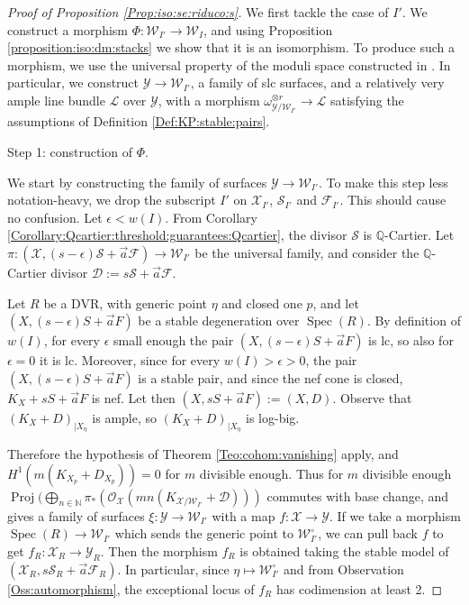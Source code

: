 \documentclass[11pt]{amsart}
\newcommand{\cE}{\mathcal{W}}
\newcommand{\sD}{\mathscr{D}}
\newcommand{\sF}{\mathscr{F}}
\newcommand{\sL}{\mathscr{L}}
\newcommand{\sS}{\mathscr{S}}
\newcommand{\sX}{\mathscr{X}}
\newcommand{\cO}{\mathcal{O}}
\newcommand{\spec}{\operatorname{Spec}}
\newcommand{\sY}{\mathscr{Y}}
\theoremstyle{definition}
\begin{document}
\begin{proof}[Proof of Proposition \ref{Prop:iso:se:riduco:s}] We first tackle the case of $I'$.
We construct a morphism $\Phi:\cE_{I'} \to \cE_I$, and using Proposition \ref{proposition:iso:dm:stacks} we show that it is an isomorphism.
To produce such a morphism, we use the universal property of the moduli space constructed in \cite{KP}. In particular, we
construct $\sY \to \cE_{I'}$, a family of slc surfaces, and a relatively very ample line bundle $\sL$ over $\sY$, with a morphism
$\omega_{\sY/\cE_{I'}}^{\otimes r} \to \sL$ satisfying the assumptions of Definition \ref{Def:KP:stable:pairs}.

\begin{bf}Step 1: construction of $\Phi$.\end{bf}
 We start by constructing the family of surfaces $\sY \to \cE_{I'}$. To make this step less notation-heavy, we drop the subscript $I'$ on $\sX_{I'}$, $\sS_{I'}$ and $\sF_{I'}$. This should cause no confusion. Let $\epsilon<w(I)$. From Corollary \ref{Corollary:Qcartier:threshold:guarantees:Qcartier}, the divisor
 $\sS$ is $\mathbb{Q}$-Cartier.
 Let $\pi:(\sX,(s-\epsilon)\sS+\vec{a}\sF) \to \cE_{I'}$ be the universal family, and consider the $\mathbb{Q}$-Cartier divisor
 $\sD:=s\sS+\vec{a}\sF$.
 
 Let $R$ be a DVR, with generic point $\eta$ and closed one $p$, and let $(X,(s-\epsilon)S+\vec{a}F)$ be a stable degeneration over $\spec(R)$.
 By definition of $w(I)$, for every $\epsilon$ small enough the pair
 $(X,(s-\epsilon)S+\vec{a}F)$ is lc, so also for $\epsilon=0$ it is lc. Moreover, since
 for every $w(I)>\epsilon>0$, the pair $(X,(s-\epsilon)S+\vec{a}F)$ is a stable pair, and since the nef cone is closed, $K_X+sS+\vec{a}F$ is nef.
 Let then $(X,sS+\vec{a}F):=(X,D)$.
 Observe that 
 $(K_X+D)_{|X_{\eta}}$ is ample, so $(K_X+D)_{|X_{\eta}}$ is log-big.
 
 Therefore the hypothesis of Theorem \ref{Teo:cohom:vanishing} apply, and $H^1(m(K_{X_p}+D_{X_p}))=0$ for $m$ divisible enough.
 Thus for $m$ divisible enough $\operatorname{Proj}(\bigoplus_{n \in \mathbb{N}}\pi_*(\cO_{\sX}(mn(K_{\sX/\cE_{I'}}+\sD)))$
 commutes with base change, and gives a family of surfaces $\xi:\sY \to \cE_{I'}$ with a map $f:\sX \to \sY$. If we take a morphism $\spec(R) \to \cE_{I'}$ which sends the generic point to $\cE_{I'}^\circ$, we can pull back $f$ to get $f_R:\sX_R \to \sY_R$. Then the morphism $f_R$ is obtained taking the stable model of $(\sX_R,s\sS_R+\vec{a}\sF_R)$. In particular, since $\eta \mapsto \cE_{I'}^\circ$ and from Observation \ref{Oss:automorphism}, the exceptional locus of $f_R$ has codimension at least 2.
 

\end{proof}
\end{document}
